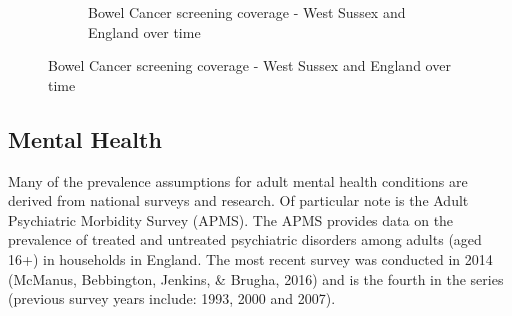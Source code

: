\begin{figure}
\begin{subfigure}[b]{0.3\textwidth}
        \caption{Bowel Cancer screening coverage - West Sussex and England over time}
        \label{fig:bowel:time}
    \end{subfigure}
\end{figure}








\clearpage

\subsection{Mental Health}
Many of the prevalence assumptions for adult mental health conditions are derived from national surveys and research. Of particular note is the Adult Psychiatric Morbidity Survey (APMS). The APMS provides data on the prevalence of treated and untreated psychiatric disorders among adults (aged 16+) in households in England. The most recent survey was conducted in 2014 (McManus, Bebbington, Jenkins, \& Brugha, 2016) and is the fourth in the series (previous survey years include: 1993, 2000 and 2007).

